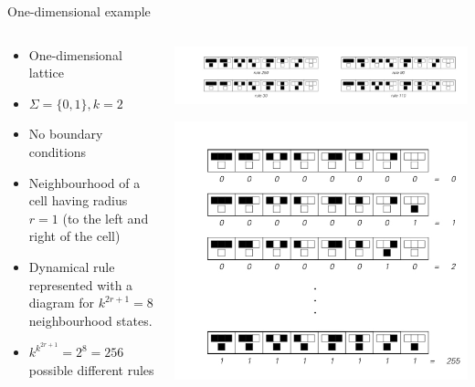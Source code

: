 \begin{frame}{One-dimensional example}

  \begin{columns}
	\begin{column}{0.5\textwidth}
	  \begin{itemize}
	  \item One-dimensional lattice
	  \item $\Sigma =\{0,1\}, k = 2$
	  \item No boundary conditions
        \item Neighbourhood of a cell having radius $r=1$ (to the left and right
					of the cell)
        \item Dynamical rule represented with a diagram for $k^{2r+1} = 8$ neighbourhood states.
        \item $k^{k^{2r+1}}=2^8= 256$ possible different rules
	  \end{itemize}

	\end{column}
	\begin{column}{0.7\textwidth}
 \includegraphics[height=0.18\textheight]{slike/rules.jpeg}
        \centering

        \includegraphics[height=0.6\textheight]{slike/PossibleRules.jpeg}
        \end{column}
    \end{columns}
\end{frame}
